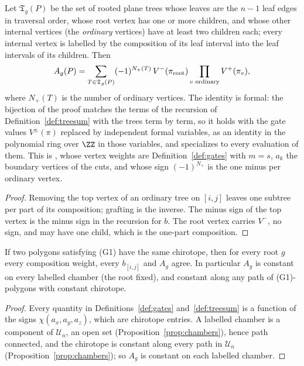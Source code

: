 \begin{lemma}\label{lem:treesum-trees}\leanok
Let $\mathfrak T_g(P)$ be the set of rooted plane trees whose leaves are the
$n-1$ leaf edges in traversal order, whose root vertex has one or more
children, and whose other internal vertices (the \emph{ordinary} vertices)
have at least two children each; every internal vertex is labelled by the
composition of its leaf interval into the leaf intervals of its children.
Then
\[
A_g(P)=\sum_{T\in\mathfrak T_g(P)}(-1)^{N_+(T)}\,
V^-(\pi_{\rm root})\prod_{v\text{ ordinary}}V^+(\pi_v),
\]
where $N_+(T)$ is the number of ordinary vertices. The identity is formal:
the bijection of the proof matches the terms of the recursion of
Definition~\ref{def:treesum} with the trees term by term, so it holds with
the gate values $V^\pm(\pi)$ replaced by independent formal variables, as an
identity in the polynomial ring over $\ZZ$ in those variables, and
specializes to every evaluation of them. This is ,
whose vertex weights are Definition~\ref{def:gates} with
$m=s$, $a_k$ the boundary vertices of the cuts, and whose sign
$(-1)^{N_+}$ is the one minus per ordinary vertex. 
\end{lemma}
\begin{proof}\leanok{}
Removing the top vertex of an ordinary tree on $[i,j]$ leaves one subtree per
part of its composition; grafting is the inverse. The minus sign of the top
vertex is the minus sign in the recursion for $b$. The root vertex carries
$V^-$, no sign, and may have one child, which is the one-part composition.
\end{proof}

\begin{proposition}\label{prop:A-chamber}\leanok
If two polygons satisfying (G1) have the same chirotope, then for every root
$g$ every composition weight, every $b_{[i,j]}$ and $A_g$ agree. In
particular $A_g$ is constant on every labelled chamber (the root fixed), and
constant along any path of (G1)-polygons with constant chirotope. 
\end{proposition}
\begin{proof}\leanok{}
Every quantity in Definitions~\ref{def:gates} and~\ref{def:treesum} is a
function of the signs $\chi(a_x,a_y,a_z)$, which are chirotope entries. A
labelled chamber is a component of $\mathcal U_n$, an open set
(Proposition~\ref{prop:chambers}), hence path connected, and the chirotope
is constant along every path in $\mathcal U_n$
(Proposition~\ref{prop:chambers}); so $A_g$ is constant on each labelled
chamber.
\end{proof}

